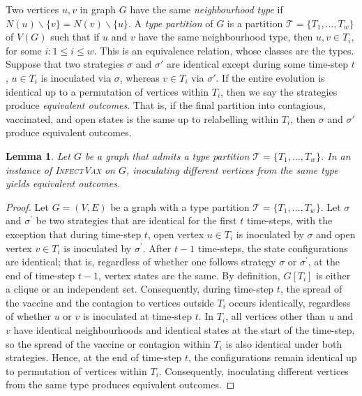 \documentclass[unknownkeysallowed]{article}
\newtheorem{lemma}[theorem]{Lemma}
\theoremstyle{definition}\newtheorem{strategy}{Strategy}
\theoremstyle{definition}\newtheorem{notation}{Notation}[theorem]
\newcommand*{\IV}{\textup{\textsc{InfectVax}}\xspace}
\begin{document}
Two vertices $u,v$ in graph $G$ have the same {\it neighbourhood type} if $N(u) \backslash \{v\} = N(v) \backslash \{u\}$.  A {\it type partition} of $G$ is a partition $\mathcal{T} = \{T_1,\dots,T_w\}$ of $V(G)$ such that if $u$ and $v$ have the same neighbourhood type, then  $u, v \in T_i$, for some $i: 1 \leq i \leq w$.  This is an equivalence relation, whose classes are the types.  Suppose that two strategies $\sigma$ and $\sigma'$ are identical except during some time-step $t$, $u \in T_i$ is inoculated via $\sigma$, whereas $v \in T_i$ via $\sigma'$.  If the entire evolution is identical up to a permutation of vertices within $T_i$, then we say the strategies produce {\it equivalent outcomes}.   That is, if the final partition into contagious, vaccinated, and open states is the same up to relabelling within $T_i$, then $\sigma$ and $\sigma'$ produce equivalent outcomes.

\begin{lemma}\label{lem:type-equivalence}
  Let $G$ be a graph that admits a type partition $\mathcal{T}=\{T_1,\dots,T_w\}$. In an instance of \IV on $G$, inoculating different vertices from the same type yields equivalent outcomes.
\end{lemma}

\begin{proof}  Let $G=(V,E)$ be a graph with a type partition $\mathcal{T} = \{T_1, \dots, T_w\}$. Let $\sigma$ and $\sigma^\prime$ be two strategies that are identical for the first $t$ time-steps, with the exception that during time-step $t$, open vertex $u \in T_i$ is inoculated by $\sigma$ and open vertex $v \in T_i$ is inoculated by $\sigma^\prime$. After $t-1$ time-steps, the state configurations are identical; that is, regardless of whether one follows strategy $\sigma$ or $\sigma^\prime$, at the end of time-step $t-1$, vertex states are the same. By definition, $G[T_i]$ is either a clique or an independent set. Consequently, during time-step $t$, the spread of the vaccine and the contagion to vertices outside $T_i$  occurs identically, regardless of whether $u$ or $v$ is inoculated at time-step $t$. In $T_i$, all vertices other than $u$ and $v$ have identical neighbourhoods and identical states at the start of the time-step, so the spread of the vaccine or contagion within $T_i$ is also identical under both strategies. Hence, at the end of time-step $t$, the configurations remain identical up to permutation of vertices within $T_i$.  Consequently, inoculating different vertices from the same type produces equivalent outcomes.
\end{proof}
\end{document}
